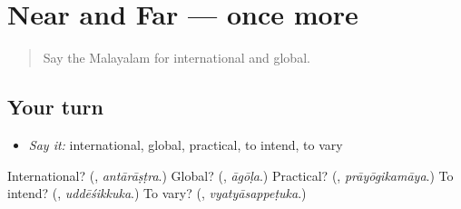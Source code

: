 \section[(dialogue)]{Near and Far — once more}

\label{lesson:ML-R460-review-final-460}



\begin{quote}
Say the Malayalam for international and global.
\end{quote}

\subsection*{Your turn}
\begin{itemize}
\raggedright
  \item \emph{Say it:} international, global, practical, to intend, to vary
\end{itemize}

\begin{tcolorbox}[breakable,colback=teal!4,colframe=teal!35!black,title={Before you move on}]
International? (\textbf{}, \emph{antārāṣṭra}.) Global? (\textbf{}, \emph{āgōḷa}.) Practical? (\textbf{}, \emph{prāyōgikamāya}.) To intend? (\textbf{}, \emph{uddēśikkuka}.) To vary? (\textbf{}, \emph{vyatyāsappeṭuka}.)
\end{tcolorbox}
